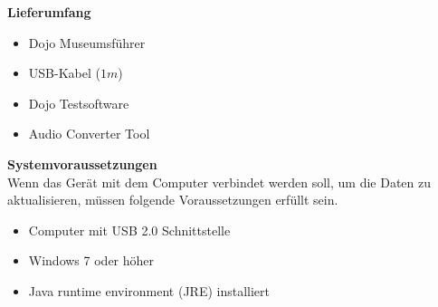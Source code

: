 \textbf{Lieferumfang}

\begin{itemize}
\item Dojo Museumsführer
\end{itemize}
\begin{itemize}
\item USB-Kabel ($1m$)
\end{itemize}
\begin{itemize}
\item Dojo Testsoftware
\end{itemize}
\begin{itemize}
\item Audio Converter Tool
\end{itemize}
\textbf{Systemvoraussetzungen}
\\[4mm]
Wenn das Gerät mit dem Computer verbindet werden soll, um die Daten zu aktualisieren, müssen folgende Voraussetzungen erfüllt sein.
\begin{itemize}
\item Computer mit USB 2.0 Schnittstelle
\end{itemize}
\begin{itemize}
\item Windows 7 oder höher
\end{itemize}
\begin{itemize}
\item Java runtime environment (JRE) installiert
\end{itemize}